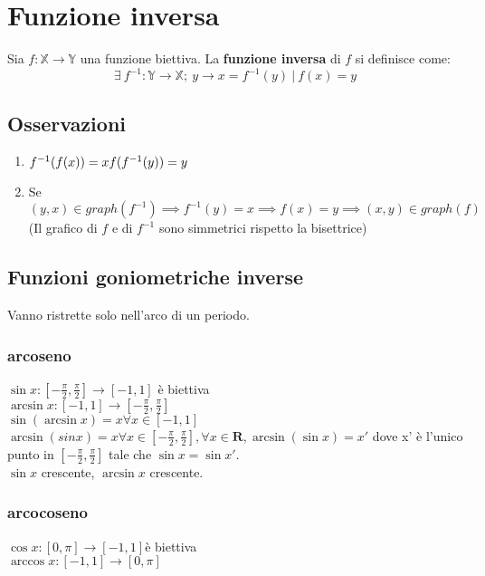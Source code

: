 \section{Funzione inversa}
Sia $f: \mathbb{X} \rightarrow \mathbb{Y}$ una funzione biettiva. La \textbf{funzione inversa} di $f$ si definisce come:
\begin{equation}
\exists\ f^{-1}: \mathbb{Y} \rightarrow \mathbb{X};\ y \rightarrow x = f^{-1}(y)\ |\ f(x) = y
\end{equation}
\subsection{Osservazioni}
\begin{enumerate}
\item $f^{-1}(f(x))=x\\
f(f^{-1}(y))=y$
\item Se $(y,x) \in graph(f^{-1}) \implies f^{-1}(y) = x \implies f(x)=y \implies (x,y) \in graph(f)$\\
(Il grafico di $f$ e di $f^{-1}$ sono simmetrici rispetto la bisettrice)
\end{enumerate}
\subsection{Funzioni goniometriche inverse}
Vanno ristrette solo nell'arco di un periodo.
\subsubsection{arcoseno}
$\sin x:[-\frac{\pi}{2}, \frac{\pi}{2}]\rightarrow [-1,1]$ \`e biettiva\\
$\arcsin x:[-1,1]\rightarrow [-\frac{\pi}{2}, \frac{\pi}{2}]$\\
$\sin(\arcsin x)=x \forall x\in [-1,1]$\\
$\arcsin(sinx)=x \forall x\in [-\frac{\pi}{2}, \frac{\pi}{2}], \forall x\in\mathbf{R}, \arcsin(\sin x)=x'$ dove x' \`e l'unico punto in $[-\frac{\pi}{2}, \frac{\pi}{2}]$ tale
che $\sin x=\sin x'$.\\
$\sin x$ crescente, $\arcsin x$ crescente.
\subsubsection{arcocoseno}
$\cos x:[0, \pi]\rightarrow [-1,1]$\`e biettiva\\
$\arccos x: [-1, 1]\rightarrow [0, \pi]$\\

